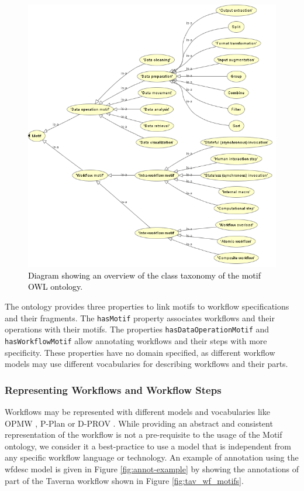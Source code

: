 \begin{figure}[t!]
\centering
\includegraphics[scale=0.60]{Figures/ontology.png}
\caption{\textcolor{black}{Diagram showing an overview of the class taxonomy of the motif OWL ontology.}}
\label{fig:ontology}
\end{figure}  

The ontology provides three properties to link motifs to workflow specifications and their fragments. The {\tt  hasMotif} property associates workflows and their operations with their motifs. The properties {\tt  hasDataOperationMotif} and {\tt  hasWorkflowMotif} allow annotating workflows and their steps with more specificity. These properties have no domain specified, as different workflow models may use different vocabularies for describing workflows and their parts. 

\subsubsection{Representing Workflows and Workflow Steps}
Workflows may be represented with different models and vocabularies like OPMW \cite{garijo_gil_2011}, P-Plan  \cite{garijo-gil-lisc12} or D-PROV \cite{Missier2013a}. While providing an abstract and consistent representation of the workflow is not a pre-requisite to the usage of the Motif ontology, we consider it a best-practice to use a model that is independent from any specific workflow language or technology. An example of annotation using the wfdesc model is given in Figure \ref{fig:annot-example} by showing the annotations of part of the Taverna workflow shown in Figure \ref{fig:tav_wf_motifs}. 

